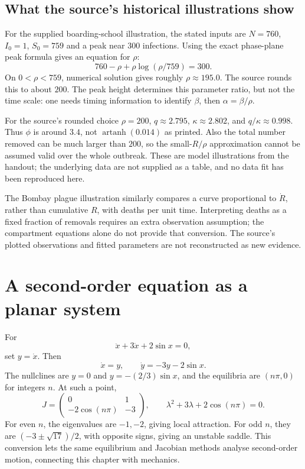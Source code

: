 \subsection{What the source's historical illustrations show}
For the supplied boarding-school illustration, the stated inputs are
$N=760$, $I_0=1$, $S_0=759$ and a peak near $300$ infections.
Using the exact phase-plane peak formula gives an equation for $\rho$:
\[
760-\rho+\rho\log(\rho/759)=300.
\]
On $0<\rho<759$, numerical solution gives roughly $\rho\approx195.0$.
The source rounds this to about $200$. The peak height determines this
parameter ratio, but not the time scale: one needs timing information to
identify $\beta$, then $\alpha=\beta/\rho$.

For the source's rounded choice $\rho=200$, $q\approx2.795$,
$\kappa\approx2.802$, and $q/\kappa\approx0.998$.
Thus $\phi$ is around $3.4$, not $\operatorname{artanh}(0.014)$ as printed.
Also the total number removed can be much larger than $200$, so the
small-$R/\rho$ approximation cannot be assumed valid over the whole outbreak.
These are model illustrations from the handout; the underlying data are
not supplied as a table, and no data fit has been reproduced here.

The Bombay plague illustration similarly compares a curve proportional
to $\dot R$, rather than cumulative $R$, with deaths per unit time.
Interpreting deaths as a fixed fraction of removals requires an extra
observation assumption; the compartment equations alone do not provide
that conversion. The source's plotted observations and fitted parameters
are not reconstructed as new evidence.

\section{A second-order equation as a planar system}
For
\[
\ddot x+3\dot x+2\sin x=0,
\]
set $y=\dot x$. Then
\[
\dot x=y,\qquad\dot y=-3y-2\sin x.
\]
The nullclines are $y=0$ and $y=-(2/3)\sin x$, and the equilibria are
$(n\pi,0)$ for integers $n$. At such a point,
\[
J=\begin{pmatrix}0&1\\-2\cos(n\pi)&-3\end{pmatrix},\qquad
\lambda^2+3\lambda+2\cos(n\pi)=0.
\]
For even $n$, the eigenvalues are $-1,-2$, giving local attraction.
For odd $n$, they are $(-3\pm\sqrt{17})/2$, with opposite signs,
giving an unstable saddle.
This conversion lets the same equilibrium and Jacobian methods analyse
second-order motion, connecting this chapter with mechanics.

